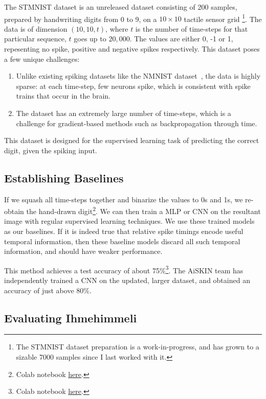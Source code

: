 \documentclass[fyp]{socreport}
\begin{document}
The STMNIST dataset is an unreleased dataset consisting of 200 samples, prepared
by handwriting digits from 0 to 9, on a $10 \times 10$ tactile sensor grid
\footnote{The STMNIST dataset preparation is a work-in-progress, and has grown
  to a sizable 7000 samples since I last worked with it.}. The data is of
dimension \((10, 10, t)\), where \(t\) is the number of time-steps for that
particular sequence, \(t\) goes up to \(20,000\). The values are either 0, -1 or
1, repesenting no spike, positive and negative spikes respectively. This dataset
poses a few unique challenges:

\begin{enumerate}
\item Unlike existing spiking datasets like the NMNIST
dataset~\cite{10.3389/fnins.2015.00481}, the data is highly sparse: at each
time-step, few neurons spike, which is consistent with spike trains that occur
in the brain.
\item The dataset has an extremely large number of time-steps, which is a
challenge for gradient-based methods such as backpropagation through time.
\end{enumerate}

This dataset is designed for the supervised learning task of predicting the
correct digit, given the spiking input.

\subsection{Establishing Baselines}

If we squash all time-steps together and binarize the values to 0s and 1s, we
re-obtain the hand-drawn digit\footnote{Colab notebook
\href{https://colab.research.google.com/drive/1EEZSOmGzvNcsGbCXiw1p7GyM5RBVv4uy}{here}.}. We
can then train a MLP or CNN on the resultant image with regular supervised
learning techniques. We use these trained models as our baselines. If it is
indeed true that relative spike timings encode useful temporal information, then
these baseline models discard all such temporal information, and should have
weaker performance.

This method achieves a test accuracy of about 75\%\footnote{Colab notebook
  \href{https://colab.research.google.com/drive/1Tig07aWvKKDnJ1VUwUf31wLpUjvupGDp}{here}.}. The
AiSKIN team has independently trained a CNN on the updated, larger dataset, and
obtained an accuracy of just above 80\%.

\subsection{Evaluating Ihmehimmeli}
\end{document}
